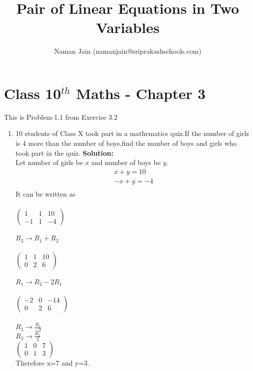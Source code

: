 \documentclass[10pt]{article}
\title{Pair of Linear Equations in Two Variables}
\author{Naman Jain (namanjain@sriprakashschools.com)}
\newcommand{\myvec}[1]{\ensuremath{\begin{pmatrix}#1\end{pmatrix}}}
\newcommand{\solution}{\noindent \textbf{Solution: }}
\begin{document}
\maketitle
\section*{Class 10$^{th}$ Maths - Chapter 3}
This is Problem-1.1 from Exercise 3.2
\begin{enumerate}
\item 10 students of Class X took part in a mathematics quiz.If the number of girls is 4 more than the number of boys,find the number of boys and girls who took part in the quiz.
\solution \\
Let number of girls be $x$ and number of boys be $y$.\\
\begin{align}
x+y=10\\
-x+y=-4\\
\end{align}
It can be written as \\
\\\myvec{1&1&10\\-1&1&-4}\\ 
\\$R_2 \xrightarrow\ R_1+R_2$\\ 
\\\myvec{1&1&10\\0&2&6}\\
\\$R_1 \xrightarrow\ R_2-2R_1$\\
\\\myvec{-2&0&-14\\0&2&6}\\
\\$R_1 \xrightarrow\ \frac{R_1}{-2}$\\ $R_2 \xrightarrow\ \frac{R_2}{2}$\\
\myvec{1&0&7\\0&1&3}\\
Therefore x=7 and y=3.
\end{enumerate}
\end{document}
